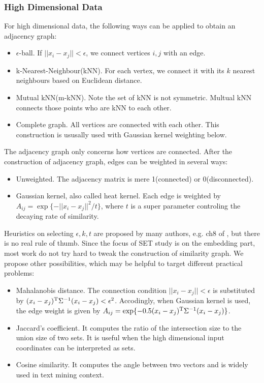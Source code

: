\subsubsection{High Dimensional Data}
\label{sec:metric_hdd}

For high dimensional data, the following ways can be 
applied to obtain an adjacency graph:
\begin{itemize}
	\item $\epsilon$-ball\cite{von2007tutorial}. If $||x_i-x_j|| < \epsilon$, we connect 
		vertices $i,j$ with an edge. 
	\item k-Nearest-Neighbour(kNN)\cite{von2007tutorial}. For each vertex, we connect 
		it with its $k$ nearest neighbours based on Euclidean distance. 
	\item Mutual kNN(m-kNN)\cite{von2007tutorial}. Note the set of kNN is not symmetric. 
		Multual kNN connects those points who are kNN to each other. 
	\item Complete graph\cite{von2007tutorial}. All vertices are connected with 
		each other. This construction is ususally used with Gaussian kernel 
		weighting below. 
\end{itemize}

The adjacency graph only concerns how vertices are connected. 
After the construction of adjacency graph, edges can be weighted in several ways:
\begin{itemize}
	\item Unweighted\cite{belkin2003laplacian}. The adjacency matrix is 
		mere 1(connected) or 0(disconnected). 
	\item Gaussian kernel\cite{von2007tutorial}, also 
		called heat kernel\cite{belkin2003laplacian}. Each edge is weighted
		by $A_{ij} = \exp\{-||x_i-x_j||^2/t\}$, where $t$ is a super parameter
		controling the decaying rate of similarity. 
\end{itemize}

Heuristics on selecting $\epsilon, k, t$ are proposed by many authors, 
e.g. ch8 of \cite{von2007tutorial}, but there is no real 
rule of thumb. Since the focus of SET study is on the embedding part, 
most work do not try hard to tweak the construction of similarity graph. 
We propose other possibilities, which may be helpful to target 
different practical problems:
\begin{itemize}
	\item Mahalanobis distance\cite{wiki_md}. The connection condition 
		$||x_i-x_j|| < \epsilon$ is substituted by 
		$(x_i-x_j)^\mathrm{T}\Sigma^{-1}(x_i-x_j) < \epsilon^2$. 
		Accodingly, when Gaussian kernel is used, the edge weight
		is given by $A_{ij} = \exp\{-0.5(x_i-x_j)^\mathrm{T}\Sigma^{-1}(x_i-x_j)\}$. 
	\item Jaccard's coefficient\cite{wiki_jaccard}. It computes the ratio 
		of the intersection size to the union size of
		two sets. It is useful when 
		the high dimensional input coordinates can be interpreted as 
		sets. 
	\item Cosine similarity\cite{wiki_cos}. It computes the 
		angle between two vectors and is widely used in 
		text mining context. 
\end{itemize}


